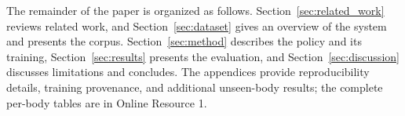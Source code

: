 The remainder of the paper is organized as follows.
Section~\ref{sec:related_work} reviews related work, and
Section~\ref{sec:dataset} gives an overview of the system and presents the
corpus. Section~\ref{sec:method} describes the policy and its training,
Section~\ref{sec:results} presents the evaluation, and
Section~\ref{sec:discussion} discusses limitations
and concludes. The appendices provide reproducibility details, training
provenance, and additional unseen-body results; the complete per-body tables
are in Online Resource 1.
